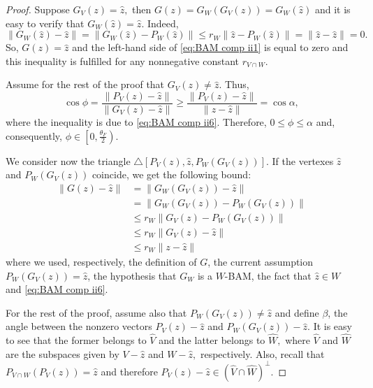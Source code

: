 \documentclass[smallextended,numbook,nospthms]{svjour3}
\theoremstyle{plain}
\theoremstyle{definition}
\begin{document}
\begin{proof}
	Suppose $G_{V}(z)=\hat{z},$ then $G(z)=G_{W}\left(G_{V}(z)\right)=G_{W}(\hat{z})$ and it is easy to verify that $G_{W}(\hat{z})=\hat{z}$. Indeed,
	\begin{equation}\label{eq:BAM comp ii11}
			\left\|G_{W}(\hat{z})-\hat{z}\right\|=\left\|G_{W}(\hat{z})-P_{W}(\hat{z})\right\| \leq r_{W}\left\|\hat{z}-P_{W}(\hat{z})\right\|=\|\hat{z}-\hat{z}\|=0.
	\end{equation}
	So, $G(z)=\hat{z}$ and the left-hand side of \cref{eq:BAM comp ii1} is equal to zero and this inequality is fulfilled for any nonnegative constant $r_{V \cap W}$.
	
	Assume for the rest of the proof that $G_{V}(z) \neq \hat{z}$. Thus,
	\begin{equation}\label{eq:BAM comp ii12}
		\cos \phi=\frac{\left\|P_{V}(z)-\hat{z}\right\|}{\left\|G_{V}(z)-\hat{z}\right\|} \geq \frac{\left\|P_{V}(z)-\hat{z}\right\|}{\|z-\hat{z}\|}=\cos \alpha,
	\end{equation}
	where the inequality is due to \cref{eq:BAM comp ii6}. Therefore, $0 \leq \phi \leq \alpha$ and, consequently, $\phi \in\left[0, \frac{\theta_{F}}{2}\right)$.
	
	We consider now the triangle $\triangle[P_{V}(z), \hat{z}, P_{W}\left(G_{V}(z)\right)]$. If the vertexes $\hat{z}$ and $P_{W}\left(G_{V}(z)\right)$ coincide, we get the following bound:
	\begin{align}
		\|G(z)-\hat{z}\| &=\left\|G_{W}\left(G_{V}(z)\right)-\hat{z}\right\| \\
		&=\left\|G_{W}\left(G_{V}(z)\right)-P_{W}\left(G_{V}(z)\right)\right\| \\
		& \leq r_{W}\left\|G_{V}(z)-P_{W}\left(G_{V}(z)\right)\right\| \\
		& \leq r_{W}\left\|G_{V}(z)-\hat{z}\right\| \\
		& \leq r_{W}\|z-\hat{z}\| \label{eq:BAM comp ii13}
	\end{align}
	where we used, respectively, the definition of $G$, the current assumption $P_{W}\left(G_{V}(z)\right)=\hat{z}$, the hypothesis that $G_{W}$ is a $W$-BAM, the fact that $\hat{z} \in W$ and \cref{eq:BAM comp ii6}.
	
	For the rest of the proof, assume also that $P_{W}\left(G_{V}(z)\right) \neq \hat{z}$ and define $\beta$, the angle between the nonzero vectors $P_{V}(z)-\hat{z}$ and $P_{W}\left(G_{V}(z)\right)-\hat{z}$. It is easy to see that the former belongs to $\hat{V}$ and the latter belongs to $\hat{W},$ where $\hat{V}$ and $\hat{W}$ are the subspaces given by $V-\hat{z}$ and $W-\hat{z},$ respectively. Also, recall that $P_{V \cap W}\left(P_{V}(z)\right)=\hat{z}$ and therefore $P_{V}(z)-\hat{z} \in(\hat{V} \cap \hat{W})^{\perp}$.
	

\end{proof}
\end{document}

